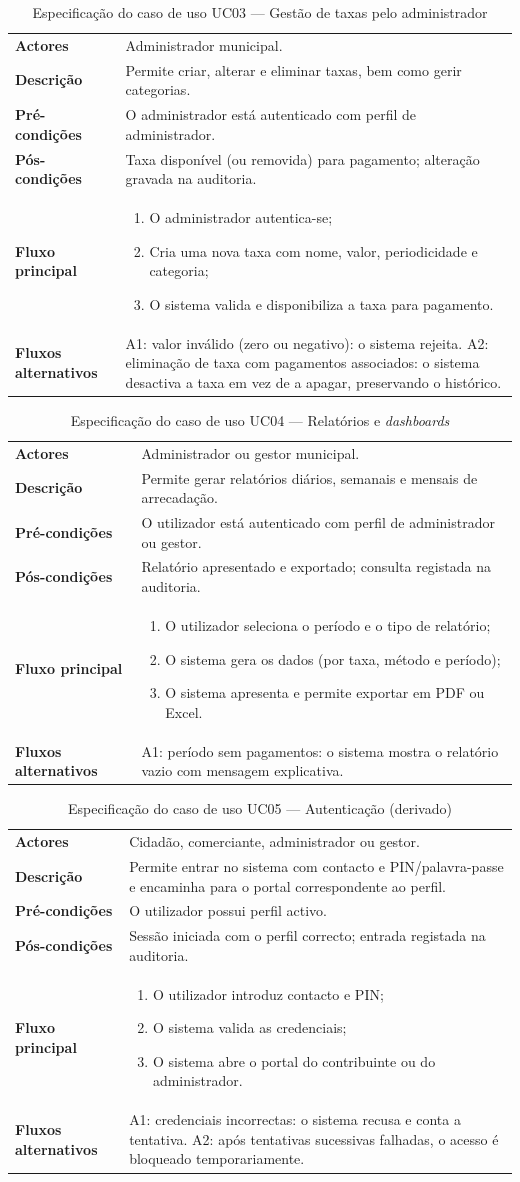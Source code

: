 \documentclass[12pt,a4paper,openany]{report}
\makeatletter
\newcommand{\ucspec}[8]{%
\begin{table}[!htbp]
\caption{Especificação do caso de uso #1 --- #2}
\label{tab:#1}
\begingroup\singlespacing\small
\begin{tabularx}{\textwidth}{@{}>{\bfseries}p{3cm}X@{}}
\toprule
Actores & #3 \\
Descrição & #4 \\
Pré-condições & #5 \\
Pós-condições & #6 \\
Fluxo principal & #7 \\
Fluxos alternativos & #8 \\
\bottomrule
\end{tabularx}
\endgroup
\end{table}}
\makeatother
\begin{document}
\ucspec{UC03}{Gestão de taxas pelo administrador}
{Administrador municipal.}
{Permite criar, alterar e eliminar taxas, bem como gerir categorias.}
{O administrador está autenticado com perfil de administrador.}
{Taxa disponível (ou removida) para pagamento; alteração gravada na auditoria.}
{\begin{enumerate}[leftmargin=1.2em]
\item O administrador autentica-se;
\item Cria uma nova taxa com nome, valor, periodicidade e categoria;
\item O sistema valida e disponibiliza a taxa para pagamento.
\end{enumerate}}
{A1: valor inválido (zero ou negativo): o sistema rejeita. A2: eliminação de taxa com pagamentos associados: o sistema desactiva a taxa em vez de a apagar, preservando o histórico.}

\ucspec{UC04}{Relatórios e \emph{dashboards}}
{Administrador ou gestor municipal.}
{Permite gerar relatórios diários, semanais e mensais de arrecadação.}
{O utilizador está autenticado com perfil de administrador ou gestor.}
{Relatório apresentado e exportado; consulta registada na auditoria.}
{\begin{enumerate}[leftmargin=1.2em]
\item O utilizador seleciona o período e o tipo de relatório;
\item O sistema gera os dados (por taxa, método e período);
\item O sistema apresenta e permite exportar em PDF ou Excel.
\end{enumerate}}
{A1: período sem pagamentos: o sistema mostra o relatório vazio com mensagem explicativa.}

\ucspec{UC05}{Autenticação (derivado)}
{Cidadão, comerciante, administrador ou gestor.}
{Permite entrar no sistema com contacto e PIN/palavra-passe e encaminha para o portal correspondente ao perfil.}
{O utilizador possui perfil activo.}
{Sessão iniciada com o perfil correcto; entrada registada na auditoria.}
{\begin{enumerate}[leftmargin=1.2em]
\item O utilizador introduz contacto e PIN;
\item O sistema valida as credenciais;
\item O sistema abre o portal do contribuinte ou do administrador.
\end{enumerate}}
{A1: credenciais incorrectas: o sistema recusa e conta a tentativa. A2: após tentativas sucessivas falhadas, o acesso é bloqueado temporariamente.}
\end{document}
